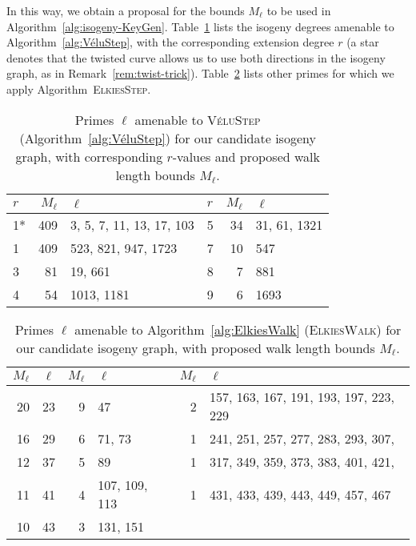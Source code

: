 \documentclass{llncs}
\newcommand{\algstyle}[1]{\textsc{#1}}
\begin{document}
In this way, we obtain a proposal for the bounds $M_\ell$
to be used in Algorithm~\ref{alg:isogeny-KeyGen}. Table~\ref{tab:VéluSteps}
lists the isogeny degrees amenable to Algorithm~\ref{alg:VéluStep}, with
the corresponding extension degree $r$ 
(a star denotes that the twisted curve
allows us to use both directions in the isogeny graph,
as in Remark~\ref{rem:twist-trick}).
Table~\ref{tab:ElkiesSteps}
lists other primes for which we apply Algorithm~\algstyle{ElkiesStep}.

\begin{table}
    \centering
    \begin{tabular}{l|@{\;}r@{\;}|@{\;}l@{\;}||@{\;}l|r@{\;}|@{\;}l}
        $r$ & $M_\ell$ & $\ell$
        &
        $r$ & $M_\ell$ & $\ell$
        \\
        \hline
        1* & 409 & 3, 5, 7, 11, 13, 17, 103
        &
        5 & 34 & 31, 61, 1321
        \\
        1 & 409 & 523, 821, 947, 1723
        &
        7 & 10 & 547
        \\
        3 & 81 & 19, 661
        &
        8 & 7 & 881
        \\
        4 & 54 & 1013, 1181
        &
        9 & 6 & 1693
        \\
        \hline
    \end{tabular}
    \smallskip
    \caption{Primes $\ell$ amenable to \algstyle{VéluStep}
    (Algorithm~\ref{alg:VéluStep}) for our candidate isogeny graph,
    with corresponding $r$-values and proposed walk length bounds $M_\ell$.}
    \label{tab:VéluSteps}
\end{table}

\begin{table}
    \centering
    \begin{tabular}{r@{\;}|@{\;}l@{\;}||@{\;}r@{\;}|@{\;}l@{\;}||@{\;}r@{\;}|@{\;}l@{\;}}
        $M_\ell$ & $\ell$
        &
        $M_\ell$ & $\ell$
        &
        $M_\ell$ & $\ell$
        \\
        \hline
        20 & 23
        &
        9  & 47
        &
        2  & 157, 163, 167, 191, 193, 197, 223, 229
        \\
        16 & 29
        &
        6  & 71, 73
        &
        1  & 241, 251, 257, 277, 283, 293, 307,
        \\
        12 & 37
        &
        5  & 89
        &
        1  & 317, 349, 359, 373, 383, 401, 421,
        \\
        11 & 41
        &
        4  & 107, 109, 113
        &
        1  & 431, 433, 439, 443, 449, 457, 467
        \\
        10 & 43
        &
        3  & 131, 151
        &
        \\
        \hline
    \end{tabular}
    \smallskip
    \caption{Primes $\ell$ amenable to 
        Algorithm~\ref{alg:ElkiesWalk} (\algstyle{ElkiesWalk})
        for our candidate isogeny graph, 
        with proposed walk length bounds $M_\ell$.}
    \label{tab:ElkiesSteps}
\end{table}
\end{document}

